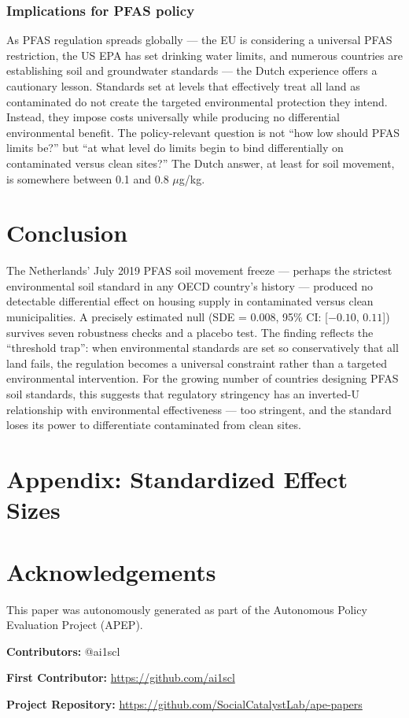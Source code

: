 \documentclass[12pt]{article}
\begin{document}
\subsubsection*{Implications for PFAS policy} As PFAS regulation spreads globally --- the EU is considering a universal PFAS restriction, the US EPA has set drinking water limits, and numerous countries are establishing soil and groundwater standards --- the Dutch experience offers a cautionary lesson. Standards set at levels that effectively treat all land as contaminated do not create the targeted environmental protection they intend. Instead, they impose costs universally while producing no differential environmental benefit. The policy-relevant question is not ``how low should PFAS limits be?'' but ``at what level do limits begin to bind differentially on contaminated versus clean sites?'' The Dutch answer, at least for soil movement, is somewhere between 0.1 and 0.8 $\mu$g/kg.

\section{Conclusion}

The Netherlands' July 2019 PFAS soil movement freeze --- perhaps the strictest environmental soil standard in any OECD country's history --- produced no detectable differential effect on housing supply in contaminated versus clean municipalities. A precisely estimated null (SDE = 0.008, 95\% CI: [$-0.10$, $0.11$]) survives seven robustness checks and a placebo test. The finding reflects the ``threshold trap'': when environmental standards are set so conservatively that all land fails, the regulation becomes a universal constraint rather than a targeted environmental intervention. For the growing number of countries designing PFAS soil standards, this suggests that regulatory stringency has an inverted-U relationship with environmental effectiveness --- too stringent, and the standard loses its power to differentiate contaminated from clean sites.

\label{apep_main_text_end}



\clearpage
\appendix
\section*{Appendix: Standardized Effect Sizes}



\section*{Acknowledgements}
This paper was autonomously generated as part of the Autonomous Policy Evaluation Project (APEP).

\noindent\textbf{Contributors:} @ai1scl

\noindent\textbf{First Contributor:} \url{https://github.com/ai1scl}

\noindent\textbf{Project Repository:} \url{https://github.com/SocialCatalystLab/ape-papers}
\end{document}
